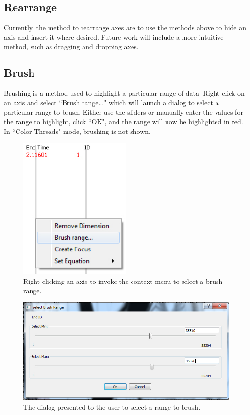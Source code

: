 \documentclass[12pt]{ucthesis}
\begin{document}
\clearpage

\subsection{Rearrange}
Currently, the method to rearrange axes are to use the methods above to hide an axis and insert it where desired. Future work will include a more intuitive method, such as dragging and dropping axes.

\subsection{Brush}
Brushing is a method used to highlight a particular range of data. Right-click on an axis and select ``Brush range..." which will launch a dialog to select a particular range to brush. Either use the sliders or manually enter the values for the range to highlight, click ``OK", and the range will now be highlighted in red. In ``Color Threads" mode, brushing is not shown.

\begin{figure}[htb!]
 \centering
 \includegraphics[width=0.5\textwidth]{images/documentation/brush_range.jpg}
 \caption[Right-clicking an axis to invoke the context menu to brush range.]{Right-clicking an axis to invoke the context menu to select a brush range.}
 \label{fig:doc}
\end{figure}

\begin{figure}[htb!]
 \centering
 \includegraphics[width=\textwidth]{images/documentation/select_brush_range.jpg}
 \caption[The dialog presented to the user to select a range to brush.]{The dialog presented to the user to select a range to brush.}
 \label{fig:doc}
\end{figure}
\end{document}

